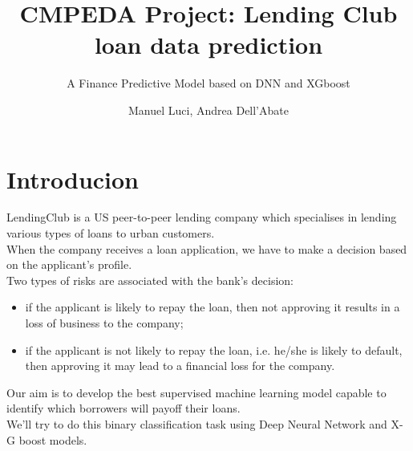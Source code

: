 \documentclass[french]{scrartcl}
\author{Manuel Luci, Andrea Dell'Abate}
\title{CMPEDA Project: Lending Club loan data prediction}
\subtitle{A Finance Predictive Model based on DNN and XGboost}
\begin{document}
\maketitle
\section{Introducion}
LendingClub is a US peer-to-peer lending company which specialises in lending various types of loans to urban customers.\\
When the company receives a loan application, we have to make a decision based on the applicant’s profile. \\
Two types of risks are associated with the bank's decision:
\begin{itemize}
	\item if the applicant is likely to repay the loan, then not approving it results in a loss of business to the company;
	
	\item if the applicant is not likely to repay the loan, i.e. he/she is likely to
	default, then approving it may lead to a financial loss for the company.
\end{itemize}
Our aim is to develop the best supervised machine learning model capable to identify which borrowers will payoff their loans.\\
We’ll try to do this binary classification task using Deep Neural Network and X-G
boost models.
\end{document}

